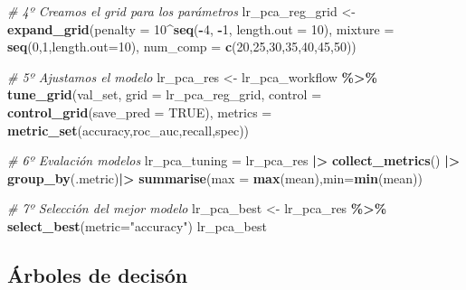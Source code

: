 \documentclass[12pt,a4paper,]{book}
\newenvironment{Shaded}{\begin{snugshade}}{\end{snugshade}}
\newcommand{\AttributeTok}[1]{\textcolor[rgb]{0.13,0.29,0.53}{#1}}
\newcommand{\CommentTok}[1]{\textcolor[rgb]{0.56,0.35,0.01}{\textit{#1}}}
\newcommand{\ConstantTok}[1]{\textcolor[rgb]{0.56,0.35,0.01}{#1}}
\newcommand{\DecValTok}[1]{\textcolor[rgb]{0.00,0.00,0.81}{#1}}
\newcommand{\FunctionTok}[1]{\textcolor[rgb]{0.13,0.29,0.53}{\textbf{#1}}}
\newcommand{\NormalTok}[1]{#1}
\newcommand{\OtherTok}[1]{\textcolor[rgb]{0.56,0.35,0.01}{#1}}
\newcommand{\SpecialCharTok}[1]{\textcolor[rgb]{0.81,0.36,0.00}{\textbf{#1}}}
\newcommand{\StringTok}[1]{\textcolor[rgb]{0.31,0.60,0.02}{#1}}
\numberwithin{dummy}{section}
\theoremstyle{ocrenumbox}
\theoremstyle{blacknumex}
\theoremstyle{blacknumbox}
\theoremstyle{ocrenum}
\theoremstyle{ocrenum}
\begin{document}
\begin{Shaded}
\begin{Highlighting}[]
\CommentTok{\# 4º Creamos el grid para los parámetros}
\NormalTok{lr\_pca\_reg\_grid }\OtherTok{\textless{}{-}} \FunctionTok{expand\_grid}\NormalTok{(}\AttributeTok{penalty =} \DecValTok{10}\SpecialCharTok{\^{}}\FunctionTok{seq}\NormalTok{(}\SpecialCharTok{{-}}\DecValTok{4}\NormalTok{, }\SpecialCharTok{{-}}\DecValTok{1}\NormalTok{, }\AttributeTok{length.out =} \DecValTok{10}\NormalTok{),}
                               \AttributeTok{mixture =} \FunctionTok{seq}\NormalTok{(}\DecValTok{0}\NormalTok{,}\DecValTok{1}\NormalTok{,}\AttributeTok{length.out=}\DecValTok{10}\NormalTok{),}
                               \AttributeTok{num\_comp =} \FunctionTok{c}\NormalTok{(}\DecValTok{20}\NormalTok{,}\DecValTok{25}\NormalTok{,}\DecValTok{30}\NormalTok{,}\DecValTok{35}\NormalTok{,}\DecValTok{40}\NormalTok{,}\DecValTok{45}\NormalTok{,}\DecValTok{50}\NormalTok{))}

\CommentTok{\# 5º Ajustamos el modelo}
\NormalTok{lr\_pca\_res }\OtherTok{\textless{}{-}} 
\NormalTok{  lr\_pca\_workflow }\SpecialCharTok{\%\textgreater{}\%} 
  \FunctionTok{tune\_grid}\NormalTok{(val\_set,}
            \AttributeTok{grid =}\NormalTok{ lr\_pca\_reg\_grid,}
            \AttributeTok{control =} \FunctionTok{control\_grid}\NormalTok{(}\AttributeTok{save\_pred =} \ConstantTok{TRUE}\NormalTok{),}
            \AttributeTok{metrics =} \FunctionTok{metric\_set}\NormalTok{(accuracy,roc\_auc,recall,spec))}

\CommentTok{\# 6º Evalación modelos}
\NormalTok{lr\_pca\_tuning }\OtherTok{=}\NormalTok{ lr\_pca\_res }\SpecialCharTok{|\textgreater{}} 
  \FunctionTok{collect\_metrics}\NormalTok{() }\SpecialCharTok{|\textgreater{}} 
  \FunctionTok{group\_by}\NormalTok{(.metric)}\SpecialCharTok{|\textgreater{}} 
  \FunctionTok{summarise}\NormalTok{(}\AttributeTok{max =} \FunctionTok{max}\NormalTok{(mean),}\AttributeTok{min=}\FunctionTok{min}\NormalTok{(mean))}

\CommentTok{\# 7º Selección del mejor modelo}
\NormalTok{lr\_pca\_best }\OtherTok{\textless{}{-}} 
\NormalTok{  lr\_pca\_res }\SpecialCharTok{\%\textgreater{}\%} 
  \FunctionTok{select\_best}\NormalTok{(}\AttributeTok{metric=}\StringTok{"accuracy"}\NormalTok{)}
\NormalTok{lr\_pca\_best}
\end{Highlighting}
\end{Shaded}

\hypertarget{uxe1rboles-de-decisuxf3n-1}{%
\subsection{Árboles de decisón}\label{uxe1rboles-de-decisuxf3n-1}}
\end{document}
